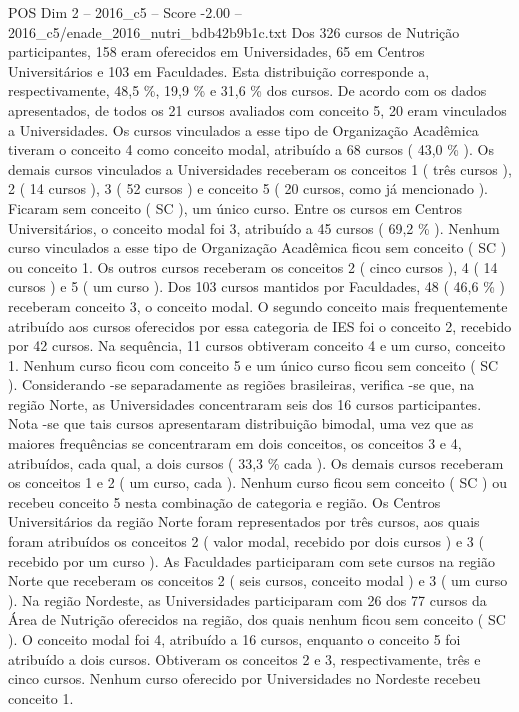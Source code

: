 \begin{textsample}{POS Dim 2 – 2016\_c5 – Score -2.00 – 2016\_c5/enade\_2016\_nutri\_bdb42b9b1c.txt}
Dos 326 cursos de Nutrição participantes, 158 eram oferecidos em Universidades, 65 em Centros Universitários e 103 em Faculdades.
Esta distribuição corresponde a, respectivamente, 48,5 \%, 19,9 \% e 31,6 \% dos cursos.
De acordo com os dados apresentados, de todos os 21 cursos avaliados com conceito 5, 20 eram vinculados a Universidades.
Os cursos vinculados a esse tipo de Organização Acadêmica tiveram o conceito 4 como conceito modal, atribuído a 68 cursos ( 43,0 \% ).
Os demais cursos vinculados a Universidades receberam os conceitos 1 ( três cursos ), 2 ( 14 cursos ), 3 ( 52 cursos ) e conceito 5 ( 20 cursos, como já mencionado ).
Ficaram sem conceito ( SC ), um único curso.
Entre os cursos em Centros Universitários, o conceito modal foi 3, atribuído a 45 cursos ( 69,2 \% ).
Nenhum curso vinculados a esse tipo de Organização Acadêmica ficou sem conceito ( SC ) ou conceito 1.
Os outros cursos receberam os conceitos 2 ( cinco cursos ), 4 ( 14 cursos ) e 5 ( um curso ).
Dos 103 cursos mantidos por Faculdades, 48 ( 46,6 \% ) receberam conceito 3, o conceito modal.
O segundo conceito mais frequentemente atribuído aos cursos oferecidos por essa categoria de IES foi o conceito 2, recebido por 42 cursos.
Na sequência, 11 cursos obtiveram conceito 4 e um curso, conceito 1.
Nenhum curso ficou com conceito 5 e um único curso ficou sem conceito ( SC ).
Considerando -se separadamente as regiões brasileiras, verifica -se que, na região Norte, as Universidades concentraram seis dos 16 cursos participantes.
Nota -se que tais cursos apresentaram distribuição bimodal, uma vez que as maiores frequências se concentraram em dois conceitos, os conceitos 3 e 4, atribuídos, cada qual, a dois cursos ( 33,3 \% cada ).
Os demais cursos receberam os conceitos 1 e 2 ( um curso, cada ).
Nenhum curso ficou sem conceito ( SC ) ou recebeu conceito 5 nesta combinação de categoria e região.
Os Centros Universitários da região Norte foram representados por três cursos, aos quais foram atribuídos os conceitos 2 ( valor modal, recebido por dois cursos ) e 3 ( recebido por um curso ).
As Faculdades participaram com sete cursos na região Norte que receberam os conceitos 2 ( seis cursos, conceito modal ) e 3 ( um curso ).
Na região Nordeste, as Universidades participaram com 26 dos 77 cursos da Área de Nutrição oferecidos na região, dos quais nenhum ficou sem conceito ( SC ).
O conceito modal foi 4, atribuído a 16 cursos, enquanto o conceito 5 foi atribuído a dois cursos.
Obtiveram os conceitos 2 e 3, respectivamente, três e cinco cursos.
Nenhum curso oferecido por Universidades no Nordeste recebeu conceito 1.

\end{textsample}
